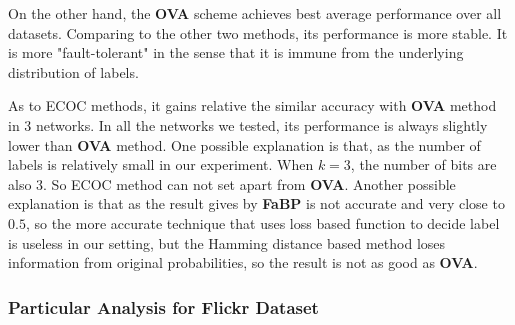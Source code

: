 On the other hand, the \textbf{OVA} scheme achieves best average performance over all datasets. Comparing to the other two methods, its performance is more stable. It is more "fault-tolerant" in the sense that it is immune from the underlying distribution of labels.

As to ECOC methods, it gains relative the similar accuracy with \textbf{OVA} method in 3 networks. In all the networks we tested, its performance is always slightly lower than \textbf{OVA} method. One possible explanation is that, as the number of labels is relatively small in our experiment. When $k=3$, the number of bits are also 3. So ECOC method can not set apart from \textbf{OVA}. Another possible explanation is that as the result gives by \textbf{FaBP} is not accurate and very close to $0.5$, so the more accurate technique that uses loss based function to decide label is useless in our setting, but the Hamming distance based method loses information from original probabilities, so the result is not as good as \textbf{OVA}.

\subsubsection*{Particular Analysis for Flickr Dataset}










